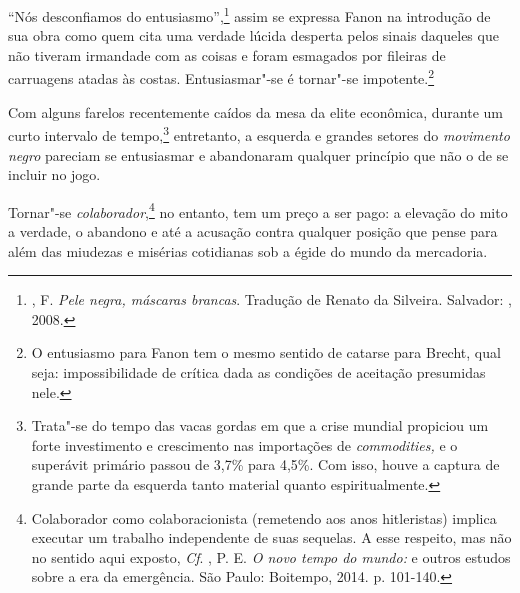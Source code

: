 ``Nós desconfiamos do entusiasmo'',\footnote{, F. \emph{Pele negra,
  máscaras brancas}. Tradução de Renato da Silveira. Salvador: ,
  2008.} assim se expressa Fanon na introdução de sua obra como quem
cita uma verdade lúcida desperta pelos sinais daqueles que não tiveram
irmandade com as coisas e foram esmagados por fileiras de carruagens
atadas às costas. Entusiasmar"-se é tornar"-se impotente.\footnote{O
  entusiasmo para Fanon tem o mesmo sentido de catarse para Brecht, qual
  seja: impossibilidade de crítica dada as condições de aceitação
  presumidas nele.}

Com alguns farelos recentemente caídos da mesa da elite econômica,
durante um curto intervalo de tempo,\footnote{Trata"-se do tempo das vacas
  gordas em que a crise mundial propiciou um forte investimento e
  crescimento nas importações de \emph{commodities,} e o superávit
  primário passou de 3,7\% para 4,5\%. Com isso, houve a captura de
  grande parte da esquerda tanto material quanto espiritualmente.}
entretanto, a esquerda e grandes setores do \emph{movimento negro}
pareciam se entusiasmar e abandonaram qualquer princípio que não o de se
incluir no jogo.

Tornar"-se \emph{colaborador},\footnote{Colaborador como colaboracionista
  (remetendo aos anos hitleristas) implica executar um trabalho
  independente de suas sequelas. A esse respeito, mas não no sentido
  aqui exposto, \emph{Cf}. , P. E. \emph{O novo tempo do mundo:} e
  outros estudos sobre a era da emergência. São Paulo: Boitempo, 2014.
  p. 101-140.} no entanto, tem um preço a ser pago: a elevação do mito
a verdade, o abandono e até a acusação contra qualquer posição que pense
para além das miudezas e misérias cotidianas sob a égide do mundo da
mercadoria.

